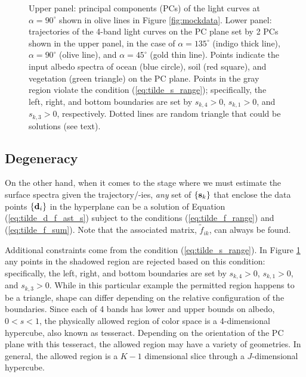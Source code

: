 \documentclass[iop,numberedappendix,apj,]{emulateapj}
\def\fast{\tilde f}
\begin{document}
\begin{figure}[t]
\begin{center}
    \end{center}
    \caption{Upper panel: principal components (PCs) of the light curves at $\alpha = 90^{\circ }$ shown in olive lines in Figure \ref{fig:mockdata}. Lower panel: trajectories of the 4-band light curves on the PC plane set by 2 PCs shown in the upper panel, in the case of $\alpha = 135^{\circ }$ (indigo thick line), $\alpha = 90^{\circ }$ (olive line), and $\alpha = 45^{\circ }$ (gold thin line). Points indicate the input albedo spectra of ocean (blue circle), soil (red square), and vegetation (green triangle) on the PC plane. Points in the gray region violate the condition (\ref{eq:tilde_s_range}); specifically, the left, right, and bottom boundaries are set by $s_{k,4} > 0$, $s_{k,1} > 0$, and $s_{k,3}> 0$, respectively. 
Dotted lines are random triangle that could be solutions (see text). }
    \label{fig:trajectory}
\end{figure}

\subsection{Degeneracy}
\label{ss:degeneracy}

On the other hand, when it comes to the stage where we must estimate the surface spectra given the trajectory/-ies, {\it any} set of $\{ {\bf s}_k \}$ that enclose the data points $\{{\bf d}_i\}$ in the hyperplane can be a solution of Equation (\ref{eq:tilde_d_f_ast_s}) subject to the conditions (\ref{eq:tilde_f_range}) and (\ref{eq:tilde_f_sum}). 
Note that the associated matrix, $\fast _{ik}$, can always be found. 

Additional constraints come from the condition (\ref{eq:tilde_s_range}). 
In Figure \ref{fig:trajectory} any points in the shadowed region are rejected based on this condition: specifically, the left, right, and bottom boundaries are set by $s_{k,4}> 0$, $s_{k,1}> 0$, and $s_{k,3}> 0$. 
While in this particular example the permitted region happens to be a triangle, shape can differ depending on the relative configuration of the boundaries. 
Since each of 4 bands has lower and upper bounds on albedo, $0<s<1$, the physically allowed region of color space is a 4-dimensional hypercube, also known as tesseract. Depending on the orientation of the PC plane with this tesseract, the allowed region may have a variety of geometries. 
In general, the allowed region is a $K-1$ dimensional slice through a $J$-dimensional hypercube. 
\end{document}
